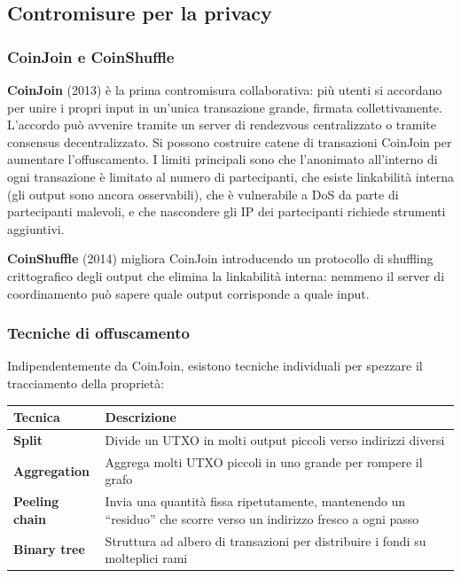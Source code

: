 \documentclass[
  italian,
  openany]{book}
\newcounter{none} %
\begin{document}
\subsection{Contromisure per la
privacy}\label{contromisure-per-la-privacy}

\subsubsection{CoinJoin e CoinShuffle}\label{coinjoin-e-coinshuffle}

\textbf{CoinJoin} (2013) è la prima contromisura collaborativa: più
utenti si accordano per unire i propri input in un'unica transazione
grande, firmata collettivamente. L'accordo può avvenire tramite un
server di rendezvous centralizzato o tramite consensus decentralizzato.
Si possono costruire catene di transazioni CoinJoin per aumentare
l'offuscamento. I limiti principali sono che l'anonimato all'interno di
ogni transazione è limitato al numero di partecipanti, che esiste
linkabilità interna (gli output sono ancora osservabili), che è
vulnerabile a DoS da parte di partecipanti malevoli, e che nascondere
gli IP dei partecipanti richiede strumenti aggiuntivi.

\textbf{CoinShuffle} (2014) migliora CoinJoin introducendo un protocollo
di shuffling crittografico degli output che elimina la linkabilità
interna: nemmeno il server di coordinamento può sapere quale output
corrisponde a quale input.

\subsubsection{Tecniche di offuscamento}\label{tecniche-di-offuscamento}

Indipendentemente da CoinJoin, esistono tecniche individuali per
spezzare il tracciamento della proprietà:

{\def\LTcaptype{none} %
\begin{longtable}[]{@{}
  >{\raggedright\arraybackslash}p{}
  >{\raggedright\arraybackslash}p{}@{}}
\toprule\noalign{}
\begin{minipage}[b]{\linewidth}\raggedright
Tecnica
\end{minipage} & \begin{minipage}[b]{\linewidth}\raggedright
Descrizione
\end{minipage} \\
\midrule\noalign{}
\endhead
\bottomrule\noalign{}
\endlastfoot
\textbf{Split} & Divide un UTXO in molti output piccoli verso indirizzi
diversi \\
\textbf{Aggregation} & Aggrega molti UTXO piccoli in uno grande per
rompere il grafo \\
\textbf{Peeling chain} & Invia una quantità fissa ripetutamente,
mantenendo un ``residuo'' che scorre verso un indirizzo fresco a ogni
passo \\
\textbf{Binary tree} & Struttura ad albero di transazioni per
distribuire i fondi su molteplici rami \\
\end{longtable}
}
\end{document}

